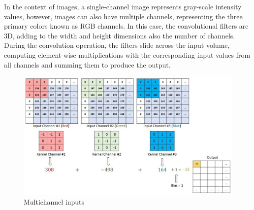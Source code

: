 In the context of images, a single-channel image represents gray-scale intensity values, however, images can also have multiple channels, representing the three primary colors known as RGB channels. In this case, the convolutional filters are 3D, adding to the width and height dimensions also the number of channels. During the convolution operation, the filters slide across the input volume, computing element-wise multiplications with the corresponding input values from all channels and summing them to produce the output.

\begin{figure}[h]
    \centering
    \includegraphics[width=15cm]{Images/rbg-filters.jpg}
    \caption{Multichannel inputs}
\end{figure}

